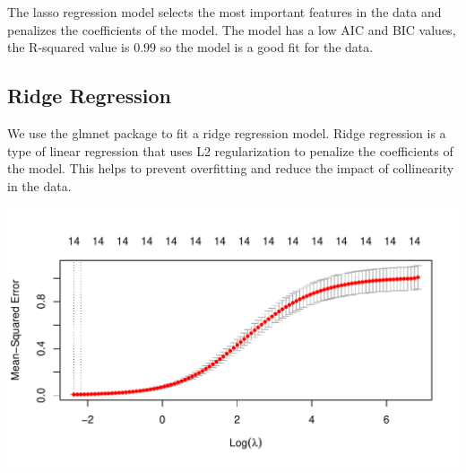 \documentclass[
]{article}
\newenvironment{Shaded}{\begin{snugshade}}{\end{snugshade}}
\newcommand{\AttributeTok}[1]{\textcolor[rgb]{0.13,0.29,0.53}{#1}}
\newcommand{\ConstantTok}[1]{\textcolor[rgb]{0.56,0.35,0.01}{#1}}
\newcommand{\DecValTok}[1]{\textcolor[rgb]{0.00,0.00,0.81}{#1}}
\newcommand{\FunctionTok}[1]{\textcolor[rgb]{0.13,0.29,0.53}{\textbf{#1}}}
\newcommand{\NormalTok}[1]{#1}
\newcommand{\OtherTok}[1]{\textcolor[rgb]{0.56,0.35,0.01}{#1}}
\newcommand{\SpecialCharTok}[1]{\textcolor[rgb]{0.81,0.36,0.00}{\textbf{#1}}}
\newcommand{\StringTok}[1]{\textcolor[rgb]{0.31,0.60,0.02}{#1}}
\begin{document}
The lasso regression model selects the most important features in the
data and penalizes the coefficients of the model. The model has a low
AIC and BIC values, the R-squared value is \(0.99\) so the model is a
good fit for the data.

\hypertarget{ridge-regression}{%
\subsection{Ridge Regression}\label{ridge-regression}}

We use the glmnet package to fit a ridge regression model. Ridge
regression is a type of linear regression that uses L2 regularization to
penalize the coefficients of the model. This helps to prevent
overfitting and reduce the impact of collinearity in the data.

\begin{Shaded}
\end{Shaded}

\begin{center}\includegraphics{Statistical_Learning_Final_Report_files/figure-latex/ridge_regression-1} \end{center}
\end{document}
